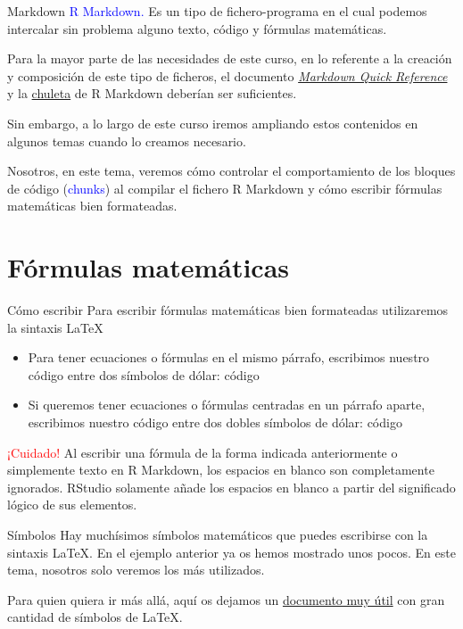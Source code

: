 \documentclass[
  ignorenonframetext,
]{beamer}
\providecommand{\tightlist}{%
  \setlength{\itemsep}{0pt}\setlength{\parskip}{0pt}}
\newcommand\blue[1]{\textcolor{blue}{#1}}
\newcommand\red[1]{\textcolor{red}{#1}}
\begin{document}
\begin{frame}{Markdown}
\label{markdown}
\blue{R Markdown.} Es un tipo de fichero-programa en el cual podemos
intercalar sin problema alguno texto, código y fórmulas matemáticas.

Para la mayor parte de las necesidades de este curso, en lo referente a
la creación y composición de este tipo de ficheros, el documento
\emph{\href{https://en.support.wordpress.com/markdown-quick-reference/}{Markdown
Quick Reference} } y la
\href{http://shiny.rstudio.com/images/rm-cheatsheet.pdf.zip.}{chuleta}
de R Markdown deberían ser suficientes.

Sin embargo, a lo largo de este curso iremos ampliando estos contenidos
en algunos temas cuando lo creamos necesario.

Nosotros, en este tema, veremos cómo controlar el comportamiento de los
bloques de código (\blue{chunks}) al compilar el fichero R Markdown y
cómo escribir fórmulas matemáticas bien formateadas.
\end{frame}

\section{Fórmulas matemáticas}\label{fuxf3rmulas-matemuxe1ticas}

\begin{frame}{Cómo escribir}
\label{cuxf3mo-escribir}
Para escribir fórmulas matemáticas bien formateadas utilizaremos la
sintaxis \LaTeX

\begin{itemize}
\tightlist
\item
  Para tener ecuaciones o fórmulas en el mismo párrafo, escribimos
  nuestro código entre dos símbolos de dólar: código
\item
  Si queremos tener ecuaciones o fórmulas centradas en un párrafo
  aparte, escribimos nuestro código entre dos dobles símbolos de dólar:
  código
\end{itemize}

\red{¡Cuidado!} Al escribir una fórmula de la forma indicada
anteriormente o simplemente texto en R Markdown, los espacios en blanco
son completamente ignorados. RStudio solamente añade los espacios en
blanco a partir del significado lógico de sus elementos.
\end{frame}

\begin{frame}{Símbolos}
\label{suxedmbolos}
Hay muchísimos símbolos matemáticos que puedes escribirse con la
sintaxis \LaTeX. En el ejemplo anterior ya os hemos mostrado unos pocos.
En este tema, nosotros solo veremos los más utilizados.

Para quien quiera ir más allá, aquí os dejamos un
\href{http://www.ptep-online.com/ctan/symbols.pdf}{documento muy útil}
con gran cantidad de símbolos de \LaTeX.
\end{frame}
\end{document}
